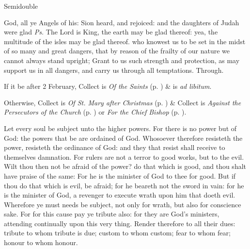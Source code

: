\begin{inhead}
{Semidouble}
\end{inhead}

\properantiphonfix

\introit
{} God, all ye Angels of his: Sion heard, and rejoiced: and the daughters of Judah were glad \textit{Ps.} The Lord is King, the earth may be glad thereof: yea, the multitude of the isles may be glad thereof.
\collect
{} who knowest us to be set in the midst of so many and great dangers, that by reason of the frailty of our nature we cannot always stand upright; Grant to us such strength and protection, as may support us in all dangers, and carry us through all temptations. Through.
\begin{rubric}
    If it be after 2 February,  Collect is \emph{Of the Saints} (p. \pageref{SPSaints}) \&  is \emph{ad libitum}.\par
    Otherwise,  Collect is \emph{Of St. Mary after Christmas} (p. \pageref{SPMaryPostChristmas}) \&  Collect is \emph{Against the Persecutors of the Church} (p. \pageref{SPAgainst}) or \emph{For the Chief Bishop} (p. \pageref{SPChiefBishop}).
\end{rubric}
 Let every soul be subject unto the higher powers. For there is no power but of God: the powers that be are ordained of God. Whosoever therefore resisteth the power, resisteth the ordinance of God: and they that resist shall receive to themselves damnation. For rulers are not a terror to good works, but to the evil. Wilt thou then not be afraid of the power? do that which is good, and thou shalt have praise of the same: For he is the minister of God to thee for good. But if thou do that which is evil, be afraid; for he beareth not the sword in vain: for he is the minister of God, a revenger to execute wrath upon him that doeth evil. Wherefore ye must needs be subject, not only for wrath, but also for conscience sake. For for this cause pay ye tribute also: for they are God's ministers, attending continually upon this very thing. Render therefore to all their dues: tribute to whom tribute is due; custom to whom custom; fear to whom fear; honour to whom honour.


